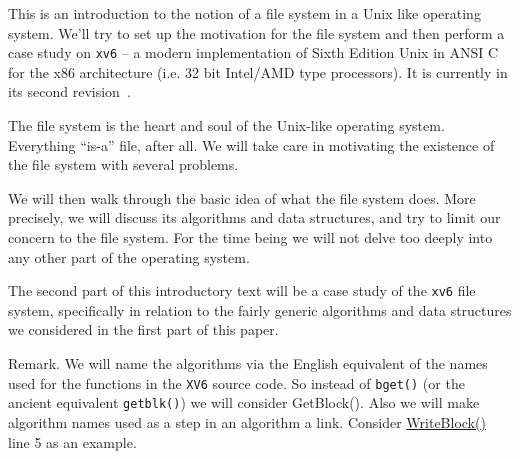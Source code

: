 
This is an introduction to the notion of a file system in a Unix
like operating system. We'll try to set up the motivation for the
file system and then perform a case study on {\tt xv6} -- a
modern implementation of Sixth Edition Unix in ANSI C for the x86
architecture (i.e. 32 bit Intel/AMD type processors). It is
currently in its second revision~\cite{xv6}.

The file system is the heart and soul of the Unix-like operating
system. Everything ``is-a'' file, after all. We will take care in
motivating the existence of the file system with several
problems.

We will then walk through the basic idea of what the file system
does. More precisely, we will discuss its algorithms and data
structures, and try to limit our concern to the file system. For
the time being we will not delve too deeply into any other part
of the operating system. 

The second part of this introductory text will be a case study of
the {\tt xv6} file system, specifically in relation to the fairly
generic algorithms and data structures we considered in the first
part of this paper.

\proclaim Remark. {We will name the algorithms via the English
equivalent of the names used for the functions in the {\tt XV6}
source code. So instead of {\tt bget()} (or the ancient
equivalent {\tt getblk()}) we will consider {\sc
GetBlock()}. Also we will make algorithm names used as a step in
an algorithm a link. Consider \hyperref[alg:writeBlock()]{\sc
WriteBlock()} line 5 as an example.}

